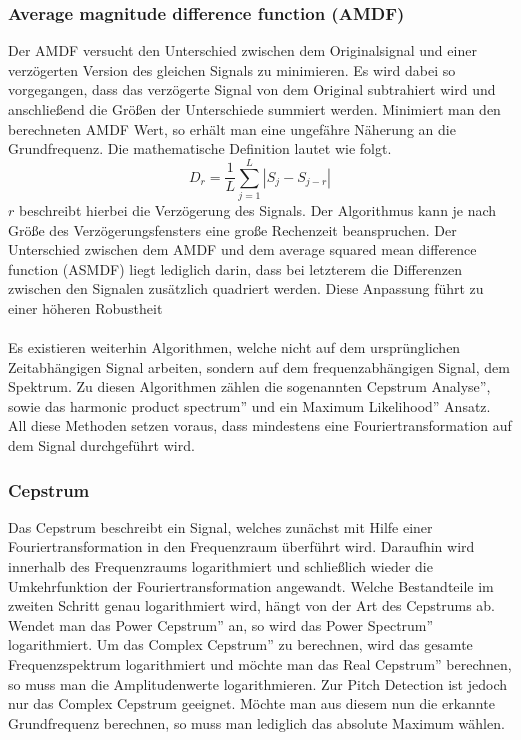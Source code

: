 \subsubsection*{Average magnitude difference function (AMDF)}
Der AMDF versucht den Unterschied zwischen dem Originalsignal und einer verzögerten Version des gleichen Signals zu minimieren. Es wird dabei so vorgegangen, dass das verzögerte Signal von dem Original subtrahiert wird und anschließend die Größen der Unterschiede summiert werden. Minimiert man den berechneten AMDF Wert, so erhält man eine ungefähre Näherung an die Grundfrequenz. \cite{ross1974average} Die mathematische Definition lautet wie folgt.
$$ D_r = \frac{1}{L} \sum_{j=1}^L |S_j - S_{j-r}| $$
$r$ beschreibt hierbei die Verzögerung des Signals. Der Algorithmus kann je nach Größe des Verzögerungsfensters eine große Rechenzeit beanspruchen. Der Unterschied zwischen dem AMDF und dem average squared mean difference function (ASMDF) liegt lediglich darin, dass bei letzterem die Differenzen zwischen den Signalen zusätzlich quadriert werden. Diese Anpassung führt zu einer höheren Robustheit
\\\\
Es existieren weiterhin Algorithmen, welche nicht auf dem ursprünglichen Zeitabhängigen Signal arbeiten, sondern auf dem frequenzabhängigen Signal, dem Spektrum. Zu diesen Algorithmen zählen die sogenannten \glqq Cepstrum Analyse'', sowie das \glqq harmonic product spectrum'' und ein \glqq Maximum Likelihood'' Ansatz. All diese Methoden setzen voraus, dass mindestens eine Fouriertransformation auf dem Signal durchgeführt wird.

\subsubsection*{Cepstrum}
Das Cepstrum beschreibt ein Signal, welches zunächst mit Hilfe einer Fouriertransformation in den Frequenzraum überführt wird. Daraufhin wird innerhalb des Frequenzraums logarithmiert und schließlich wieder die Umkehrfunktion der Fouriertransformation angewandt. Welche Bestandteile im zweiten Schritt genau logarithmiert wird, hängt von der Art des Cepstrums ab. Wendet man das \glqq Power Cepstrum'' an, so wird das \glqq Power Spectrum'' logarithmiert. Um das \glqq Complex Cepstrum'' zu berechnen, wird das gesamte Frequenzspektrum logarithmiert und möchte man das \glqq Real Cepstrum'' berechnen, so muss man die Amplitudenwerte logarithmieren.  \cite{oppenheim2004frequency} Zur Pitch Detection ist jedoch nur das Complex Cepstrum geeignet. Möchte man aus diesem nun die erkannte Grundfrequenz berechnen, so muss man lediglich das absolute Maximum wählen. 

